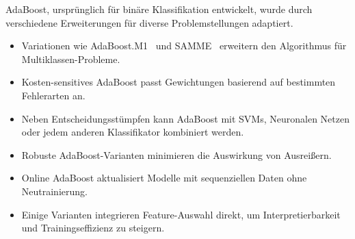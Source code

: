 AdaBoost, ursprünglich für binäre Klassifikation entwickelt,
wurde durch verschiedene Erweiterungen für diverse Problemstellungen adaptiert.

\begin{itemize}
    \item Variationen wie \glqq AdaBoost.M1\grqq~ und \glqq SAMME\grqq~ erweitern den Algorithmus für Multiklassen-Probleme. \cite{hastie2009multi}
    \item Kosten-sensitives AdaBoost passt Gewichtungen basierend auf bestimmten Fehlerarten an. \cite{masnadi2010cost}
    \item Neben Entscheidungsstümpfen kann AdaBoost mit SVMs, Neuronalen Netzen oder jedem anderen Klassifikator kombiniert werden. \cite{zhang2016stock}
    \item Robuste AdaBoost-Varianten minimieren die Auswirkung von Ausreißern. \cite{viola2001fast}
    \item Online AdaBoost aktualisiert Modelle mit sequenziellen Daten ohne Neutrainierung. \cite{hu2013online}
    \item Einige Varianten integrieren Feature-Auswahl direkt, um Interpretierbarkeit und Trainingseffizienz zu steigern. \cite{wu2003learning}
\end{itemize}